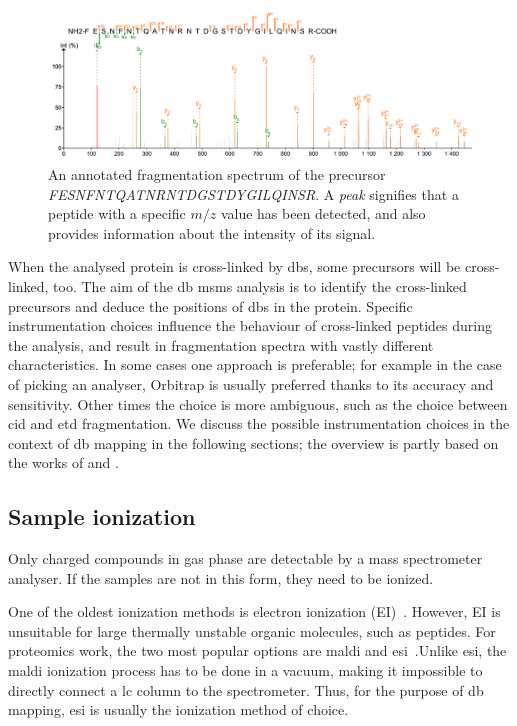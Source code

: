 \begin{figure}
  \centering
  \includegraphics[width=1\linewidth]{img/fragmentation-spectrum.png}
  \caption{An annotated fragmentation spectrum of the precursor \emph{FESNFNTQATNRNTDGSTDYGILQINSR}. A \emph{peak} signifies that a peptide with a specific \(m/z\) value has been detected, and also provides information about the intensity of its signal.}\label{fig:frag-spectrum}
\end{figure}

When the analysed protein is cross-linked by \glspl*{db}, some precursors will be cross-linked, too. The aim of the \gls*{db} \gls*{msms} analysis is to identify the cross-linked precursors and deduce the positions of \glspl*{db} in the protein. Specific instrumentation choices influence the behaviour of cross-linked peptides during the analysis, and result in fragmentation spectra with vastly different characteristics. In some cases one approach is preferable; for example in the case of picking an analyser, Orbitrap is usually preferred thanks to its accuracy and sensitivity. Other times the choice is more ambiguous, such as the choice between \gls*{cid} and \gls*{etd} fragmentation. We discuss the possible instrumentation choices in the context of \gls*{db} mapping in the following sections; the overview is partly based on the works of \citet{matthiesen2007mass} and \citet{gross2006mass}.

\subsection{Sample ionization}\label{sec:ionization}

Only charged compounds in gas phase are detectable by a mass spectrometer analyser. If the samples are not in this form, they need to be ionized.

One of the oldest ionization methods is electron ionization (EI)~\cite{field2013electron}. However, EI is unsuitable for large thermally unstable organic molecules, such as peptides. For proteomics work, the two most popular options are \gls*{maldi} and \gls*{esi}~\cite{caprioli1997molecular, fenn1990electrospray}.\@ Unlike \gls*{esi}, the \gls*{maldi} ionization process has to be done in a vacuum, making it impossible to directly connect a \gls*{lc} column to the spectrometer. Thus, for the purpose of \gls*{db} mapping, \gls*{esi} is usually the ionization method of choice.

